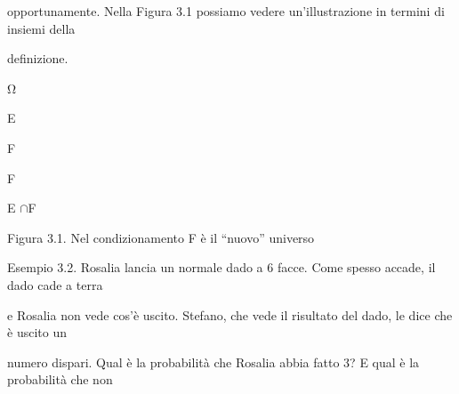\documentclass[a4paper,portrait,12pt]{article}
\begin{document}
\begin{flushleft}
opportunamente. Nella Figura 3.1 possiamo vedere un'illustrazione in termini di insiemi della
\end{flushleft}


\begin{flushleft}
definizione.
\end{flushleft}





\begin{flushleft}
Ω
\end{flushleft}


\begin{flushleft}
E
\end{flushleft}





\begin{flushleft}
F
\end{flushleft}





\begin{flushleft}
F
\end{flushleft}


\begin{flushleft}
E $\cap$F
\end{flushleft}





\begin{flushleft}
Figura 3.1. Nel condizionamento F \`{e} il ``nuovo'' universo
\end{flushleft}





\begin{flushleft}
Esempio 3.2. Rosalia lancia un normale dado a 6 facce. Come spesso accade, il dado cade a terra
\end{flushleft}


\begin{flushleft}
e Rosalia non vede cos'\`{e} uscito. Stefano, che vede il risultato del dado, le dice che \`{e} uscito un
\end{flushleft}


\begin{flushleft}
numero dispari. Qual \`{e} la probabilit\`{a} che Rosalia abbia fatto 3? E qual \`{e} la probabilit\`{a} che non
\end{flushleft}
\end{document}
